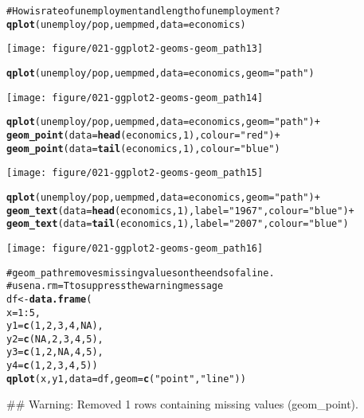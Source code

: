 \documentclass[a4paper,titlepage]{tufte-handout}\usepackage{graphicx, color}
\makeatletter
\def\maxwidth{ %
  \ifdim\Gin@nat@width>\linewidth
    \linewidth
  \else
    \Gin@nat@width
  \fi
}
\newcommand{\hlfunctioncall}[1]{\textcolor[rgb]{0.501960784313725,0,0.329411764705882}{\textbf{#1}}}%
\newcommand{\hlstring}[1]{\textcolor[rgb]{0.6,0.6,1}{#1}}%
\newcommand{\hlcomment}[1]{\textcolor[rgb]{0.180392156862745,0.6,0.341176470588235}{#1}}%
\newenvironment{kframe}{%
 \def\at@end@of@kframe{}%
 \ifinner\ifhmode%
  \def\at@end@of@kframe{\end{minipage}}%
  \begin{minipage}{\columnwidth}%
 \fi\fi%
 \def\FrameCommand##1{\hskip\@totalleftmargin \hskip-\fboxsep
 \colorbox{shadecolor}{##1}\hskip-\fboxsep
     \hskip-\linewidth \hskip-\@totalleftmargin \hskip\columnwidth}%
 \MakeFramed {\advance\hsize-\width
   \@totalleftmargin\z@ \linewidth\hsize
   \@setminipage}}%
 {\par\unskip\endMakeFramed%
 \at@end@of@kframe}
\newenvironment{knitrout}{}{} %
\makeatother
\begin{document}
\begin{knitrout}
\begin{kframe}
\begin{alltt}
\hlcomment{# How is rate of unemployment and length of unemployment?}
\hlfunctioncall{qplot}(unemploy/pop, uempmed, data=economics)
\end{alltt}
\end{kframe}
\texttt{[image: figure/021-ggplot2-geoms-geom\_path13]} 
\begin{kframe}\begin{alltt}
\hlfunctioncall{qplot}(unemploy/pop, uempmed, data=economics, geom=\hlstring{"path"})
\end{alltt}
\end{kframe}
\texttt{[image: figure/021-ggplot2-geoms-geom\_path14]} 
\begin{kframe}\begin{alltt}
\hlfunctioncall{qplot}(unemploy/pop, uempmed, data=economics, geom=\hlstring{"path"}) +
  \hlfunctioncall{geom_point}(data=\hlfunctioncall{head}(economics, 1), colour=\hlstring{"red"}) +
  \hlfunctioncall{geom_point}(data=\hlfunctioncall{tail}(economics, 1), colour=\hlstring{"blue"})
\end{alltt}
\end{kframe}
\texttt{[image: figure/021-ggplot2-geoms-geom\_path15]} 
\begin{kframe}\begin{alltt}
\hlfunctioncall{qplot}(unemploy/pop, uempmed, data=economics, geom=\hlstring{"path"}) +
  \hlfunctioncall{geom_text}(data=\hlfunctioncall{head}(economics, 1), label=\hlstring{"1967"}, colour=\hlstring{"blue"}) +
  \hlfunctioncall{geom_text}(data=\hlfunctioncall{tail}(economics, 1), label=\hlstring{"2007"}, colour=\hlstring{"blue"})
\end{alltt}
\end{kframe}
\texttt{[image: figure/021-ggplot2-geoms-geom\_path16]} 
\begin{kframe}\begin{alltt}

\hlcomment{# geom_path removes missing values on the ends of a line.}
\hlcomment{# use na.rm = T to suppress the warning message}
df <- \hlfunctioncall{data.frame}(
  x = 1:5,
  y1 = \hlfunctioncall{c}(1, 2, 3, 4, NA),
  y2 = \hlfunctioncall{c}(NA, 2, 3, 4, 5),
  y3 = \hlfunctioncall{c}(1, 2, NA, 4, 5),
  y4 = \hlfunctioncall{c}(1, 2, 3, 4, 5))
\hlfunctioncall{qplot}(x, y1, data = df, geom = \hlfunctioncall{c}(\hlstring{"point"},\hlstring{"line"}))
\end{alltt}


{\ttfamily\noindent\textcolor{warningcolor}{\#\# Warning: Removed 1 rows containing missing values (geom\_point).}}


\end{kframe}
\end{knitrout}
\end{document}
